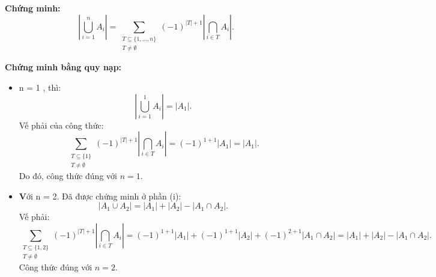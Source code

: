 \documentclass[a4paper,12pt]{article}
\begin{document}
\textbf{Chứng minh:
\[
\left| \bigcup_{i=1}^{n} A_i \right| = \sum_{\substack{T \subseteq \{1, \ldots, n\} \\ T \neq \emptyset}} (-1)^{|T|+1} \left| \bigcap_{i \in T} A_i \right|.
\]}

\textbf{Chứng minh bằng quy nạp:}

\begin{itemize}
    \item n = 1 , thì:
    \[
    \left| \bigcup_{i=1}^{1} A_i \right| = |A_1|.
    \]
    Vế phải của công thức:
    \[
    \sum_{\substack{T \subseteq \{1\} \\ T \neq \emptyset}} (-1)^{|T|+1} \left| \bigcap_{i \in T} A_i \right| = (-1)^{1+1} |A_1| = |A_1|.
    \]
    Do đó, công thức đúng với $n=1$.

    \item \textbf Với n = 2. Đã được chứng minh ở phần (i):
    \[
    |A_1 \cup A_2| = |A_1| + |A_2| - |A_1 \cap A_2|.
    \]
    Vế phải:
    \[
    \sum_{\substack{T \subseteq \{1,2\} \\ T \neq \emptyset}} (-1)^{|T|+1} \left| \bigcap_{i \in T} A_i \right| = (-1)^{1+1} |A_1| + (-1)^{1+1} |A_2| + (-1)^{2+1} |A_1 \cap A_2| = |A_1| + |A_2| - |A_1 \cap A_2|.
    \]
    Công thức đúng với $n=2$.


\end{itemize}
\end{document}
